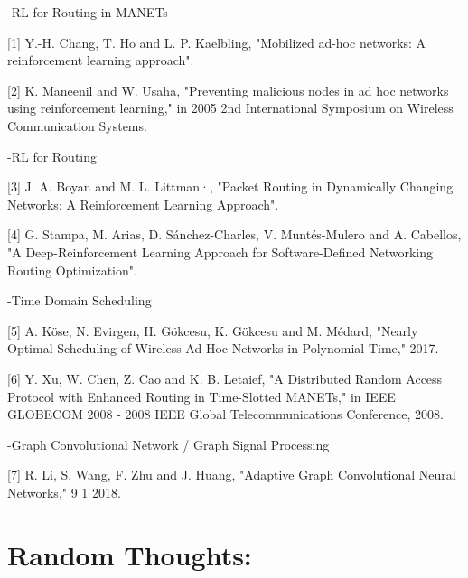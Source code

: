 \documentclass[11pt]{article}
\begin{document}
\begin{flushleft}

-RL for Routing in MANETs
\medskip

[1] 	Y.-H. Chang, T. Ho and L. P. Kaelbling, "Mobilized ad-hoc networks: A reinforcement learning approach". 
\medskip

[2] 	K. Maneenil and W. Usaha, "Preventing malicious nodes in ad hoc networks using reinforcement learning," in 2005 2nd International Symposium on Wireless Communication Systems. 
\medskip
\medskip

-RL for Routing
\medskip

[3] 	J. A. Boyan and M. L. Littman·, "Packet Routing in Dynamically Changing Networks: A Reinforcement Learning Approach". 
\medskip

[4] 	G. Stampa, M. Arias, D. Sánchez-Charles, V. Muntés-Mulero and A. Cabellos, "A Deep-Reinforcement Learning Approach for Software-Defined Networking Routing Optimization". 
\medskip
\medskip

-Time Domain Scheduling
\medskip

[5] 	A. Köse, N. Evirgen, H. Gökcesu, K. Gökcesu and M. Médard, "Nearly Optimal Scheduling of Wireless Ad Hoc Networks in Polynomial Time," 2017. 
\medskip

[6] 	Y. Xu, W. Chen, Z. Cao and K. B. Letaief, "A Distributed Random Access Protocol with Enhanced Routing in Time-Slotted MANETs," in IEEE GLOBECOM 2008 - 2008 IEEE Global Telecommunications Conference, 2008. 
\medskip
\medskip

-Graph Convolutional Network / Graph Signal Processing
\medskip

[7] 	R. Li, S. Wang, F. Zhu and J. Huang, "Adaptive Graph Convolutional Neural Networks," 9 1 2018. 


\end{flushleft}


    \hypertarget{random-thoughts}{%
\pagebreak
\section{Random Thoughts:}\label{random-thoughts}}
\end{document}

